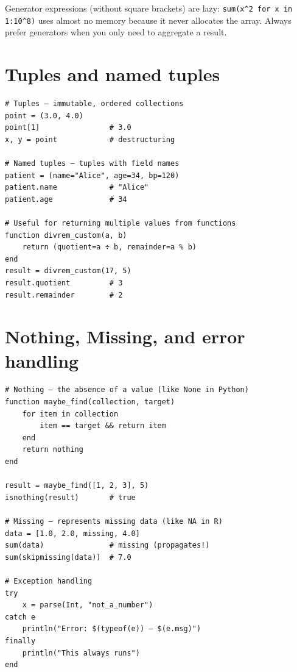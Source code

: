 \begin{performancetip}
Generator expressions (without square brackets) are lazy: \texttt{sum(x\^{}2 for x in 1:10\^{}8)} uses almost no memory because it never allocates the array. Always prefer generators when you only need to aggregate a result.
\end{performancetip}

\section{Tuples and named tuples}

\begin{verbatim}
# Tuples — immutable, ordered collections
point = (3.0, 4.0)
point[1]                # 3.0
x, y = point            # destructuring

# Named tuples — tuples with field names
patient = (name="Alice", age=34, bp=120)
patient.name            # "Alice"
patient.age             # 34

# Useful for returning multiple values from functions
function divrem_custom(a, b)
    return (quotient=a ÷ b, remainder=a % b)
end
result = divrem_custom(17, 5)
result.quotient         # 3
result.remainder        # 2
\end{verbatim}

\section{Nothing, Missing, and error handling}

\begin{verbatim}
# Nothing — the absence of a value (like None in Python)
function maybe_find(collection, target)
    for item in collection
        item == target && return item
    end
    return nothing
end

result = maybe_find([1, 2, 3], 5)
isnothing(result)       # true

# Missing — represents missing data (like NA in R)
data = [1.0, 2.0, missing, 4.0]
sum(data)               # missing (propagates!)
sum(skipmissing(data))  # 7.0

# Exception handling
try
    x = parse(Int, "not_a_number")
catch e
    println("Error: $(typeof(e)) — $(e.msg)")
finally
    println("This always runs")
end
\end{verbatim}

